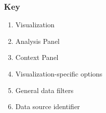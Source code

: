 \subsubsection*{Key}

\begin{enumerate}
    \item{Visualization}
    \item{Analysis Panel}
    \item{Context Panel}
    \item{Visualization-specific options}
    \item{General data filters}
    \item{Data source identifier}
\end{enumerate}

